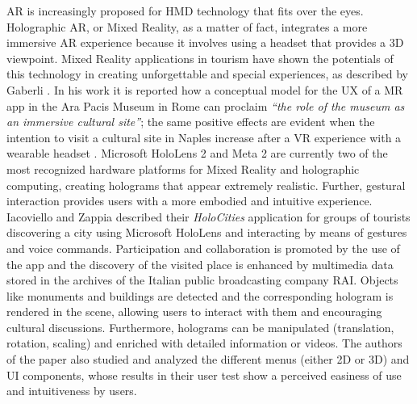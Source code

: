 AR is increasingly proposed for HMD technology that fits over the eyes. Holographic AR, or Mixed Reality, as a matter of fact, integrates a more immersive AR experience because it involves using a headset that provides a 3D viewpoint.
Mixed Reality applications in tourism have shown the potentials of this technology in creating unforgettable and special experiences, as described by Gaberli \cite{gaberli_tourism_2019}. In his work it is reported how a conceptual model for the UX of a MR app in the Ara Pacis Museum \cite{jung_impact_2020} in Rome can proclaim \textit{“the role of the museum as an immersive cultural site”}; the same positive effects are evident when the intention to visit a cultural site in Naples increase after a VR experience with a wearable headset \cite{marasco_exploring_2018}.
Microsoft HoloLens 2 and Meta 2 are currently two of the most recognized hardware platforms for Mixed Reality and holographic computing, creating holograms that appear extremely realistic. Further, gestural interaction provides users with a more embodied and intuitive experience. 
Iacoviello and Zappia \cite{iacoviello_holocities_2020} described their \textit{HoloCities} application for groups of tourists discovering a city using Microsoft HoloLens and interacting by means of gestures and voice commands. Participation and collaboration is promoted by the use of the app and the discovery of the visited place is enhanced by multimedia data stored in the archives of the Italian public broadcasting company RAI. Objects like monuments and buildings are detected and the corresponding hologram is rendered in the scene, allowing users to interact with them and encouraging cultural discussions. Furthermore, holograms can be manipulated (translation, rotation, scaling) and enriched with detailed information or videos.
The authors of the paper also studied and analyzed the different menus (either 2D or 3D) and UI components, whose results in their user test show a perceived easiness of use and intuitiveness by users.

